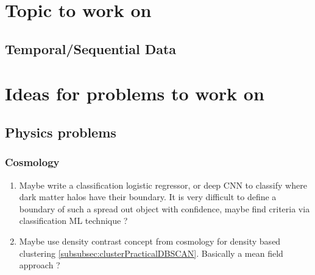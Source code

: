 \chapter{Topic to work on}
\section{Temporal/Sequential Data}
\chapter{Ideas for problems to work on}
\section{Physics problems}
\subsection{Cosmology}
\begin{enumerate}
	\item Maybe write a classification logistic regressor, or deep CNN to classify where dark matter halos have their boundary. It is very difficult to define a boundary of such a spread out object with confidence, maybe find criteria via classification ML technique ?
\item Maybe use density contrast concept from cosmology for density based clustering \ref{subsubsec:clusterPracticalDBSCAN}. Basically a mean field approach ?
\end{enumerate}
